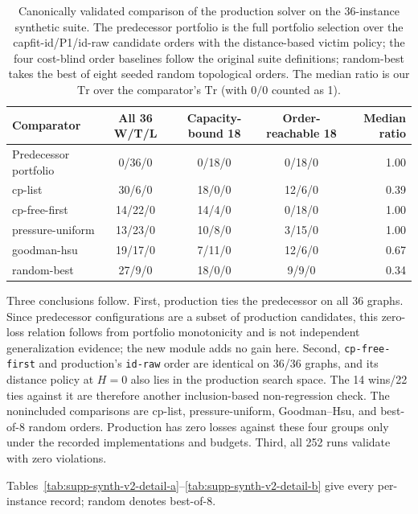 \begin{table}[htbp]
\centering
\caption{Canonically validated comparison of the production solver on the
36-instance synthetic suite.  The predecessor portfolio is the full portfolio
selection over the capfit-id/P1/id-raw candidate orders with the
distance-based victim policy; the four cost-blind order baselines follow the
original suite definitions; random-best takes the best of eight seeded random
topological orders.  The median ratio is our $\mathrm{Tr}$ over the comparator's $\mathrm{Tr}$
(with $0/0$ counted as 1).}
\label{tab:supp-synth-v2-suite}
\begin{tabular}{lcccr}
\toprule
Comparator & All 36 W/T/L & Capacity-bound 18 & Order-reachable 18 & Median ratio\\
\midrule
Predecessor portfolio & 0/36/0 & 0/18/0 & 0/18/0 & 1.00\\
cp-list & 30/6/0 & 18/0/0 & 12/6/0 & 0.39\\
cp-free-first & 14/22/0 & 14/4/0 & 0/18/0 & 1.00\\
pressure-uniform & 13/23/0 & 10/8/0 & 3/15/0 & 1.00\\
goodman-hsu & 19/17/0 & 7/11/0 & 12/6/0 & 0.67\\
random-best & 27/9/0 & 18/0/0 & 9/9/0 & 0.34\\
\bottomrule
\end{tabular}
\end{table}

Three conclusions follow. First, production ties the predecessor on all 36
graphs. Since predecessor configurations are a subset of production candidates,
this zero-loss relation follows from portfolio monotonicity and is not independent
generalization evidence; the new module adds no gain here. Second,
\texttt{cp-free-first} and production's \texttt{id-raw} order are identical on
36/36 graphs, and its distance policy at $H=0$ also lies in the production search
space. The 14 wins/22 ties against it are therefore another inclusion-based
non-regression check. The nonincluded comparisons are cp-list, pressure-uniform,
Goodman--Hsu, and best-of-8 random orders. Production has zero losses against
these four groups only under the recorded implementations and budgets. Third,
all 252 runs validate with zero violations.

Tables~\ref{tab:supp-synth-v2-detail-a}--\ref{tab:supp-synth-v2-detail-b}
give every per-instance record; random denotes best-of-8.


